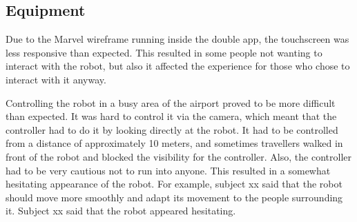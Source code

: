 \subsection{Equipment}
Due to the Marvel wireframe running inside the double app, the touchscreen was less responsive than expected. This resulted in some people not wanting to interact with the robot, but also it affected the experience for those who chose to interact with it anyway.

Controlling the robot in a busy area of the airport proved to be more difficult than expected. It was hard to control it via the camera, which meant that the controller had to do it by looking directly at the robot. It had to be controlled from a distance of approximately 10 meters, and sometimes travellers walked in front of the robot and blocked the visibility for the controller. Also, the controller had to be very cautious not to run into anyone. This resulted in a somewhat hesitating appearance of the robot. For example, subject xx said that the robot should move more smoothly and adapt its movement to the people surrounding it. Subject xx said that the robot appeared hesitating.